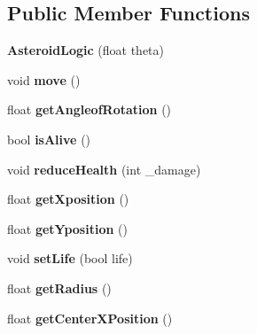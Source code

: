 \subsection*{Public Member Functions}
\begin{DoxyCompactItemize}
\item 
\mbox{\label{class_asteroid_logic_af566df9981ce525a41f7ce42e49e64b0}} 
{\bfseries Asteroid\+Logic} (float theta)
\item 
\mbox{\label{class_asteroid_logic_af20b202c4f5857279192733a0b2fdbd3}} 
void {\bfseries move} ()
\item 
\mbox{\label{class_asteroid_logic_a2087d2a3b9bf9e6f1367833454b2fb97}} 
float {\bfseries get\+Angleof\+Rotation} ()
\item 
\mbox{\label{class_asteroid_logic_a18e01f832db4f109799fc01c8c15efcd}} 
bool {\bfseries is\+Alive} ()
\item 
\mbox{\label{class_asteroid_logic_a54519e4b2719c70d17f5a28bb0d8fb56}} 
void {\bfseries reduce\+Health} (int \+\_\+damage)
\item 
\mbox{\label{class_asteroid_logic_a1d79a614c5e1a9409404f6a2def25761}} 
float {\bfseries get\+Xposition} ()
\item 
\mbox{\label{class_asteroid_logic_a83863c5262a29b2999d04ad443622bbc}} 
float {\bfseries get\+Yposition} ()
\item 
\mbox{\label{class_asteroid_logic_a594dc710574cac901e9999474b9379fe}} 
void {\bfseries set\+Life} (bool life)
\item 
\mbox{\label{class_asteroid_logic_a575d9f801770906960b65dafe937fba5}} 
float {\bfseries get\+Radius} ()
\item 
\mbox{\label{class_asteroid_logic_a4bff0373a2cefe48c984b469ddbcb52d}} 
float {\bfseries get\+Center\+X\+Position} ()
\item 
\mbox{\label{class_asteroid_logic_a00c9cda893b9dee7e2225377dd54a2eb}} 

\end{DoxyCompactItemize}
